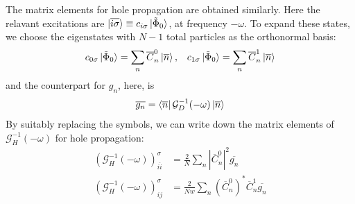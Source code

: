 \documentclass{report}
\numberwithin{equation}{section}
\begin{document}
The matrix elements for hole propagation are obtained similarly. Here the relavant excitations are $\ket{\overline{i\sigma}} \equiv c_{i\sigma}\ket{\tilde \Phi_0}$, at frequency $-\omega$. To expand these states, we choose the eigenstates with $N-1$ total particles as the orthonormal basis:
\begin{equation}\begin{aligned}
	c_{0\sigma}\ket{\tilde \Phi_0} = \sum_n \overline C^0_n \ket{\overline{n}}, && c_{1\sigma}\ket{\tilde \Phi_0} = \sum_n \overline C^1_n \ket{\overline{n}}%
\end{aligned}\end{equation}
and the counterpart for $g_n$, here, is
\begin{equation}\begin{aligned}
	\overline {g_n} = \bra{\overline n}\mathcal{G}_{D}^{-1}(-\omega)\ket{\overline n}
\end{aligned}\end{equation}
By suitably replacing the symbols, we can write down the matrix elements of $\mathcal{G}_H^{-1}(-\omega)$ for hole propagation:
\begin{equation}\begin{aligned}
	\left(\mathcal{G}_{H}^{-1}(-\omega)\right)_{\overline{ii}}^\sigma &= \frac{2}{N}\sum_{n} |\overline C^0_{n}|^2 \overline{g_n}\\
	\left(\mathcal{G}_{H}^{-1}(-\omega)\right)_{ij}^\sigma &= \frac{2}{Nw}\sum_{n} \left(\overline C^0_{n}\right)^* \overline C^1_{n} \overline{g_n} 
\end{aligned}\end{equation}
\end{document}
